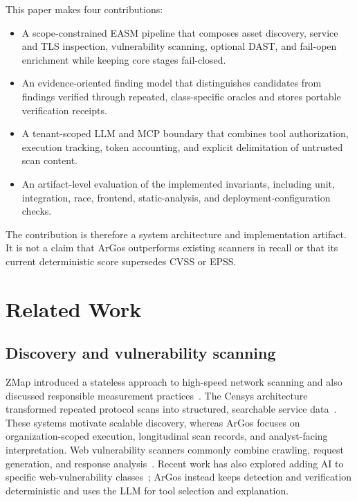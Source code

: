 \documentclass[conference,a4paper]{IEEEtran}
\newcommand{\argos}{ArGos\xspace}
\begin{document}
This paper makes four contributions:
\begin{itemize}
    \item A scope-constrained EASM pipeline that composes asset discovery, service and TLS inspection, vulnerability scanning, optional DAST, and fail-open enrichment while keeping core stages fail-closed.
    \item An evidence-oriented finding model that distinguishes candidates from findings verified through repeated, class-specific oracles and stores portable verification receipts.
    \item A tenant-scoped LLM and MCP boundary that combines tool authorization, execution tracking, token accounting, and explicit delimitation of untrusted scan content.
    \item An artifact-level evaluation of the implemented invariants, including unit, integration, race, frontend, static-analysis, and deployment-configuration checks.
\end{itemize}

The contribution is therefore a system architecture and implementation artifact. It is not a claim that \argos outperforms existing scanners in recall or that its current deterministic score supersedes CVSS or EPSS.

\section{Related Work}

\subsection{Discovery and vulnerability scanning}

ZMap introduced a stateless approach to high-speed network scanning and also discussed responsible measurement practices~\cite{Durumeric2013ZMap}. The Censys architecture transformed repeated protocol scans into structured, searchable service data~\cite{Durumeric2015Censys}. These systems motivate scalable discovery, whereas \argos focuses on organization-scoped execution, longitudinal scan records, and analyst-facing interpretation. Web vulnerability scanners commonly combine crawling, request generation, and response analysis~\cite{Chen2020WebScanner}. Recent work has also explored adding AI to specific web-vulnerability classes~\cite{Manivannan2025AIScanner}; \argos instead keeps detection and verification deterministic and uses the LLM for tool selection and explanation.
\end{document}

